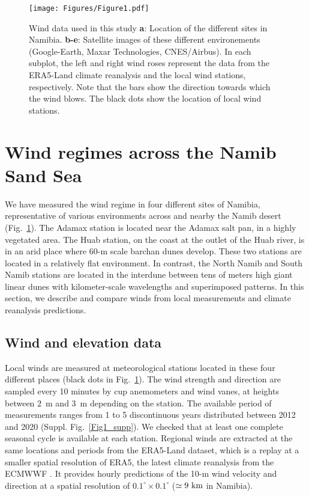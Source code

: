 \begin{figure}[t]
\centering
\texttt{[image: Figures/Figure1.pdf]}
\caption{Wind data used in this study \textbf{a}: Location of the different sites in Namibia. \textbf{b-e}: Satellite images of these different environements (Google-Earth, Maxar Technologies, CNES/Airbus). In each subplot, the left and right wind roses represent the data from the ERA5-Land climate reanalysis and the local wind stations, respectively. Note that the bars show the direction towards which the wind blows. The black dots show the location of local wind stations.}
\label{Fig1}
\end{figure}


\section{Wind regimes across the Namib Sand Sea}
We have measured the wind regime in four different sites of Namibia, representative of various environments across and nearby the Namib desert (Fig.~\ref{Fig1}). The Adamax station is located near the Adamax salt pan, in a highly vegetated area. The Huab station, on the coast at the outlet of the Huab river, is in an arid place where $60$-m scale barchan dunes develop. These two stations are located in a relatively flat  environment. In contrast, the North Namib and South Namib stations are located in the interdune between tens of meters high giant linear dunes with kilometer-scale wavelengths and superimposed patterns. In this section, we describe and compare winds from local measurements and climate reanalysis predictions.

\subsection{Wind and elevation data}
Local winds are measured at meteorological stations located in these four different places (black dots in Fig.~\ref{Fig1}). The wind strength and direction are sampled every 10 minutes by cup anemometers and wind vanes, at heights between $2$~m and $3$~m depending on the station. The available period of measurements ranges from 1 to 5 discontinuous years distributed between 2012 and 2020 (Suppl. Fig.~\ref{Fig1_supp}). We checked that at least one complete seasonal cycle is available at each station. Regional winds are extracted at the same locations and periods from the ERA5-Land dataset, which is a replay at a smaller spatial resolution of ERA5, the latest climate reanalysis from the ECMWWF \citep{Hersbach2020, munoz2021}. It provides hourly predictions of the 10-m wind velocity and direction at a spatial resolution of $0.1^\circ\times0.1^\circ$ ($\simeq 9~\textup{km}$ in Namibia).

